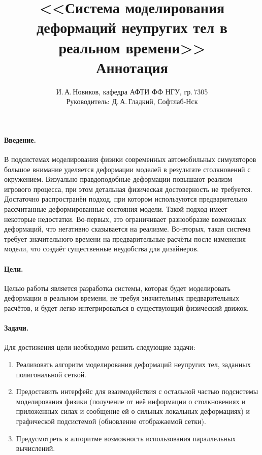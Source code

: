 \documentclass[a4paper,11pt]{article}
\author{И.\,А.\,Новиков, кафедра АФТИ ФФ НГУ, гр.\,7305\\ Руководитель: Д.\,А.\,Гладкий, Софтлаб-Нск}
\title{<<Система моделирования деформаций неупругих тел в реальном времени>>\\ Аннотация}
\begin{document}
  \maketitle
  \thispagestyle{empty}
  \paragraph{Введение.}
    В подсистемах моделирования физики современных автомобильных симуляторов большое внимание
    уделяется деформации моделей в результате столкновений с окружением. Визуально
    правдоподобные деформации повышают реализм игрового процесса, при этом детальная
    физическая достоверность не требуется. Достаточно распространён подход, при
    котором используются предварительно рассчитанные деформированные состояния модели.
    Такой подход имеет некоторые недостатки.
    Во-первых, это ограничивает разнообразие возможных деформаций, что негативно сказывается на
    реализме.  Во-вторых, такая система требует значительного времени на предварительные расчёты после изменения
    модели, что создаёт существенные неудобства для дизайнеров.
  \paragraph{Цели.}
    Целью работы является разработка системы, которая будет моделировать деформации в реальном
    времени, не требуя значительных предварительных расчётов, и будет легко интегрироваться в существующий
    физический движок.
  \paragraph{Задачи.}
    Для достижения цели необходимо решить следующие задачи:
    \begin{enumerate}
      \item Реализовать алгоритм моделирования деформаций неупругих тел, заданных полигональной сеткой.
      \item Предоставить интерфейс для взаимодействия с остальной частью подсистемы моделирования
        физики (получение от неё информации о столкновениях и приложенных силах и сообщение ей о
        сильных локальных деформациях) и графической подсистемой (обновление отображаемой сетки).
      \item Предусмотреть в алгоритме возможность использования параллельных вычислений.
    \end{enumerate}
\end{document}
